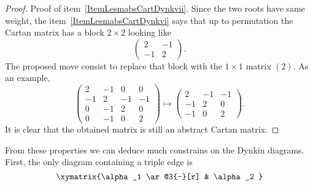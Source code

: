 \begin{proof}
	Proof of item~\ref{ItemLesmabsCartDynkvii}. Since the two roots have same weight, the item~\ref{ItemLesmabsCartDynkvi} says that up to permutation the Cartan matrix has a block \( 2\times 2\) looking like
	\begin{equation}
		\begin{pmatrix}
			2  & -1 \\
			-1 & 2
		\end{pmatrix}.
	\end{equation}
	The proposed move consist to replace that block with the \( 1\times 1\) matrix \( (2)\). As an example,
	\begin{equation}
		\begin{pmatrix}
			2  & -1 & 0  & 0  \\
			-1 & 2  & -1 & -1 \\
			0  & -1 & 2  & 0  \\
			0  & -1 & 0  & 2
		\end{pmatrix}\mapsto
		\begin{pmatrix}
			2  & -1 & -1 \\
			-1 & 2  & 0  \\
			-1 & 0  & 2
		\end{pmatrix}.
	\end{equation}
	It is clear that the obtained matrix is still an abstract Cartan matrix.
\end{proof}

From these properties we can deduce much constrains on the Dynkin diagrams. First, the only diagram containing a triple edge is
\begin{equation}
	\xymatrix{%
		\alpha_1 \ar@3{-}[r]        &   \alpha_2
	}
\end{equation}

